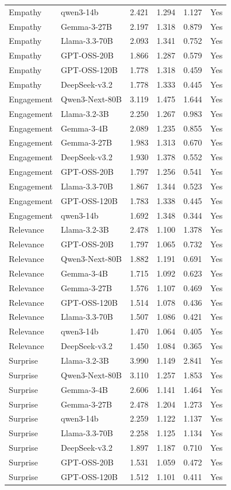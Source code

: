 \begin{table}[t]
{\begin{tabular}{llrrrl}
Empathy & qwen3-14b & 2.421 & 1.294 & 1.127 & Yes \\
Empathy & Gemma-3-27B & 2.197 & 1.318 & 0.879 & Yes \\
Empathy & Llama-3.3-70B & 2.093 & 1.341 & 0.752 & Yes \\
Empathy & GPT-OSS-20B & 1.866 & 1.287 & 0.579 & Yes \\
Empathy & GPT-OSS-120B & 1.778 & 1.318 & 0.459 & Yes \\
Empathy & DeepSeek-v3.2 & 1.778 & 1.333 & 0.445 & Yes \\
Engagement & Qwen3-Next-80B & 3.119 & 1.475 & 1.644 & Yes \\
Engagement & Llama-3.2-3B & 2.250 & 1.267 & 0.983 & Yes \\
Engagement & Gemma-3-4B & 2.089 & 1.235 & 0.855 & Yes \\
Engagement & Gemma-3-27B & 1.983 & 1.313 & 0.670 & Yes \\
Engagement & DeepSeek-v3.2 & 1.930 & 1.378 & 0.552 & Yes \\
Engagement & GPT-OSS-20B & 1.797 & 1.256 & 0.541 & Yes \\
Engagement & Llama-3.3-70B & 1.867 & 1.344 & 0.523 & Yes \\
Engagement & GPT-OSS-120B & 1.783 & 1.338 & 0.445 & Yes \\
Engagement & qwen3-14b & 1.692 & 1.348 & 0.344 & Yes \\
Relevance & Llama-3.2-3B & 2.478 & 1.100 & 1.378 & Yes \\
Relevance & GPT-OSS-20B & 1.797 & 1.065 & 0.732 & Yes \\
Relevance & Qwen3-Next-80B & 1.882 & 1.191 & 0.691 & Yes \\
Relevance & Gemma-3-4B & 1.715 & 1.092 & 0.623 & Yes \\
Relevance & Gemma-3-27B & 1.576 & 1.107 & 0.469 & Yes \\
Relevance & GPT-OSS-120B & 1.514 & 1.078 & 0.436 & Yes \\
Relevance & Llama-3.3-70B & 1.507 & 1.086 & 0.421 & Yes \\
Relevance & qwen3-14b & 1.470 & 1.064 & 0.405 & Yes \\
Relevance & DeepSeek-v3.2 & 1.450 & 1.084 & 0.365 & Yes \\
Surprise & Llama-3.2-3B & 3.990 & 1.149 & 2.841 & Yes \\
Surprise & Qwen3-Next-80B & 3.110 & 1.257 & 1.853 & Yes \\
Surprise & Gemma-3-4B & 2.606 & 1.141 & 1.464 & Yes \\
Surprise & Gemma-3-27B & 2.478 & 1.204 & 1.273 & Yes \\
Surprise & qwen3-14b & 2.259 & 1.122 & 1.137 & Yes \\
Surprise & Llama-3.3-70B & 2.258 & 1.125 & 1.134 & Yes \\
Surprise & DeepSeek-v3.2 & 1.897 & 1.187 & 0.710 & Yes \\
Surprise & GPT-OSS-20B & 1.531 & 1.059 & 0.472 & Yes \\
Surprise & GPT-OSS-120B & 1.512 & 1.101 & 0.411 & Yes \\
\bottomrule
\end{tabular}
}
\end{table}